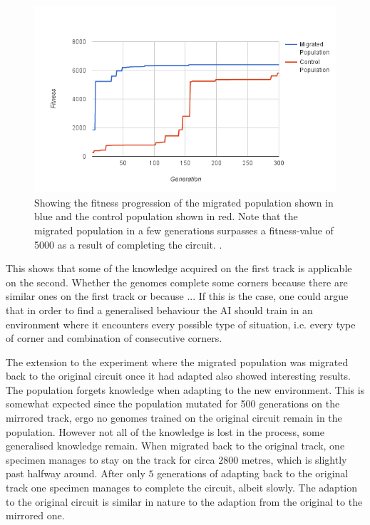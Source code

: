 \begin{figure}[H]
\includegraphics[width=\textwidth]{report/images/graphs/mirror_migration}
\centering
\caption{Showing the fitness progression of the migrated population shown in blue and the control population shown in red. Note that the migrated population in a few generations surpasses a fitness-value of 5000 as a result of completing the circuit. . }
\label{fig:mirrordata}
\end{figure}

This shows that some of the knowledge acquired on the first track is applicable on the second. Whether the genomes complete some corners because there are similar ones on the first track or because ... If this is the case, one could argue that in order to find a generalised behaviour the AI should train in an environment where it encounters every possible type of situation, i.e. every type of corner and combination of consecutive corners. 

The extension to the experiment where the migrated population was migrated back to the original circuit once it had adapted also showed interesting results. The population forgets knowledge when adapting to the new environment. This is somewhat expected since the population mutated for 500 generations on the mirrored track, ergo no genomes trained on the original circuit remain in the population. However not all of the knowledge is lost in the process, some generalised knowledge remain. When migrated back to the original track, one specimen manages to stay on the track for circa $2800$ metres, which is slightly past halfway around. After only $5$ generations of adapting back to the original track one specimen manages to complete the circuit, albeit slowly. The adaption to the original circuit is similar in nature to the adaption from the original to the mirrored one. 


